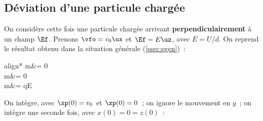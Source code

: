 \documentclass[../../main/main.tex]{subfiles}
\begin{document}
\subsection{Déviation d'une particule chargée}
\noindent
\begin{minipage}[t]{.60\linewidth}
	On considère cette fois une particule chargée arrivant
	\textbf{perpendiculairement} à un champ $\Ef$. Prenons $\vfo = v_0\ux$ et $\Ef =
		E\uz$, avec $E=U/d$.  On reprend le résultat obtenu dans la situation générale
	(\ref{ssec:egen})~:
	\begin{empheq}[left=\empheqlbrace]{align*}
		m\xpp &= 0\\
		m\ypp &= 0\\
		m\zpp &= qE
	\end{empheq}
	On intègre, avec $\xp(0) = v_0$ et $\zp(0) = 0$~; on ignore le mouvement en
	$y$~; on intègre une seconde fois, avec $x(0) = 0 = z(0)$~:
\end{minipage}
\hfill
\begin{minipage}[t]{.39\linewidth}
	\vspace{0pt}
	\begin{center}
		\vspace{-15pt}
		\label{fig:edev}
	\end{center}
\end{minipage}
\end{document}

